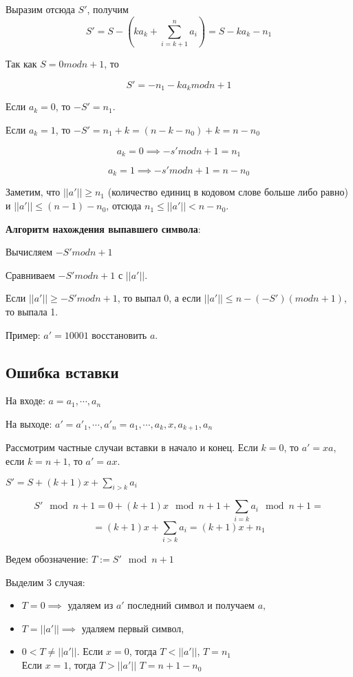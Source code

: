 {Выразим отсюда $S'$, получим
\[
    S' = S - \left( ka_k + \sum_{i=k+1}^n a_i \right) = S - ka_k - n_1
\]

Так как $S = 0 mod n + 1$, то

\[
    S' = -n_1 - ka_k mod n + 1
\]

Если $a_k = 0$, то $-S' = n_1$.

Если $a_k = 1$, то $-S' = n_1 + k = (n - k - n_0) + k = n - n_0$

\[
    a_k = 0 \implies -s' mod n+1 = n_1
\]

\[
    a_k = 1 \implies -s' mod n + 1 = n - n_0
\]

Заметим, что $||a'|| \geq n_1$ (количество единиц в кодовом слове больше либо
равно) и $||a'|| \leq (n - 1) - n_0$, отсюда $n_1 \leq ||a'|| < n - n_0$.

\textbf{Алгоритм нахождения выпавшего символа}:

Вычисляем $-S' mod n + 1$

Сравниваем $-S' mod n + 1$ с $||a'||$.

Если $||a'|| \geq -S' mod n + 1$, то выпал 0, а если $||a'|| \leq n - (-S')
(mod n + 1)$, то выпала 1.

Пример: $a' = 10001$ восстановить $a$.

\subsection{Ошибка вставки}

На входе: $a = a_1, \cdots, a_n$

На выходе: $a' = a'_1, \cdots, a'_n = a_1, \cdots, a_k, x, a_{k+1}, a_n$

Рассмотрим частные случаи вставки в начало и конец.
Если $k = 0$, то $a' = xa$, если $k = n + 1$, то $a' = ax$.

$S' = S + (k+1) x + \sum_{i > k} a_i$

\[
    S' \mod{n + 1} = 0 + (k + 1) x \mod{n + 1} + \sum_{i=k} a_i \mod{n + 1} =
\]
\[
    = (k+1) x + \sum_{i > k} a_i = (k + 1) x + n_1
\]

Ведем обозначение: $T := S' \mod{n + 1}$

Выделим 3 случая:
\begin{itemize}
    \item $T = 0 \implies$ удаляем из $a'$ последний символ и получаем $a$,

    \item $T = ||a'|| \implies$ удаляем первый символ,

    \item $0 < T \neq ||a'||$.
        Если $x = 0$, тогда $T < ||a'||$, $T = n_1$\\
        Если $x = 1$, тогда $T > ||a'||$ $T = n + 1 - n_0$


\end{itemize}}
